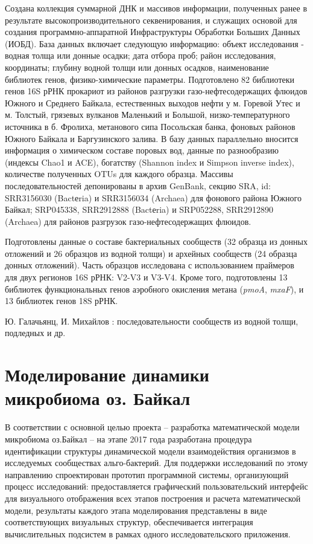 \documentclass[a4paper,12pt,openany,final]{extreport}
\begin{document}
Создана коллекция суммарной ДНК и массивов информации, полученных ранее
в результате высокопроизводительного секвенирования, и служащих основой
для создания программно-аппаратной Инфраструктуры Обработки Больших
Данных (ИОБД). База данных включает следующую информацию: объект
исследования - водная толща или донные осадки; дата отбора проб; район
исследования, координаты; глубину водной толщи или донных осадков,
наименование библиотек генов, физико-химические параметры. Подготовлено
82 библиотеки генов 16S рРНК прокариот из районов разгрузки
газо-нефтесодержащих флюидов Южного и Среднего Байкала, естественных
выходов нефти у м. Горевой Утес и м. Толстый, грязевых вулканов
Маленький и Большой, низко-температурного источника в б. Фролиха,
метанового сипа Посольская банка, фоновых районов Южного Байкала и
Баргузинского залива. В базу данных параллельно вносится информация о
химическом составе поровых вод, данные по разнообразию (индексы Chao1 и
ACE), богатству (Shannon index и Simpson inverse index), количестве
полученных OTUs для каждого образца. Массивы последовательностей
депонированы в архив GenBank, секцию SRA, id: SRR3156030 (Bactеria) и
SRR3156034 (Archaea) для фонового района Южного Байкал; SRP045338,
SRR2912888 (Bactеria) и SRP052288, SRR2912890 (Archaea) для районов
разгрузок газо-нефтесодержащих флюидов.

Подготовлены данные о составе бактериальных сообществ (32 образца из
донных отложений и 26 образцов из водной толщи) и архейных сообществ (24
образца донных отложений). Часть образцов исследована с использованием
праймеров для двух регионов 16S рРНК: V2-V3 и V3-V4. Кроме того,
подготовлены 13 библиотек функциональных генов аэробного окисления
метана (\emph{pmoA}, \emph{mxaF}), и 13 библиотек генов 18S рРНК.

Ю. Галачьянц, И. Михайлов : последовательности сообществ из водной
толщи, подледных и др.

\chapter{Моделирование динамики микробиома оз. Байкал}\label{chap:9}

В соответствии с основной целью проекта -- разработка математической
модели микробиома оз.Байкал -- на этапе 2017 года разработана процедура
идентификации структуры динамической модели взаимодействия организмов в
исследуемых сообществах альго-бактерий. Для поддержки исследований по
этому направлению спроектирован прототип программной системы,
организующий процесс исследований: предоставляется графический
пользовательский интерфейс для визуального отображения всех этапов
построения и расчета математической модели, результаты каждого этапа
моделирования представлены в виде соответствующих визуальных структур,
обеспечивается интеграция вычислительных подсистем в рамках одного
исследовательского приложения.
\end{document}
